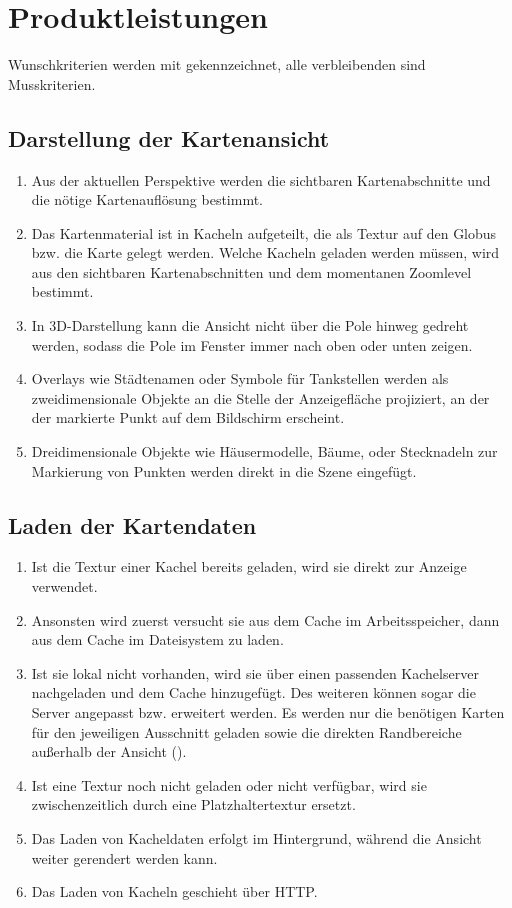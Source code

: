 \documentclass[10pt]{scrreprt}
\begin{document}
\chapter{Produktleistungen}

\renewcommand{\labelenumi}{\textbf{/L\numprint{\theenumi}0/}}
Wunschkriterien werden mit \W  gekennzeichnet, alle verbleibenden sind Musskriterien.

\section{Darstellung der Kartenansicht}
\begin{enumerate}[leftmargin=2cm]
\item Aus der aktuellen Perspektive werden die sichtbaren Kartenabschnitte und die nötige Kartenauflösung bestimmt.
\item Das Kartenmaterial ist in Kacheln aufgeteilt, die als Textur auf den Globus bzw. die Karte gelegt werden. Welche Kacheln geladen werden müssen, wird  aus den sichtbaren Kartenabschnitten und dem momentanen Zoomlevel bestimmt.
\item In 3D-Darstellung kann die Ansicht nicht über die Pole hinweg gedreht werden, sodass die Pole im Fenster immer nach oben oder unten zeigen.
\item Overlays wie Städtenamen oder Symbole für Tankstellen werden als zweidimensionale Objekte an die Stelle der Anzeigefläche projiziert, an der der markierte Punkt auf dem Bildschirm erscheint.
\item \W Dreidimensionale Objekte wie Häusermodelle, Bäume, oder Stecknadeln zur Markierung von Punkten werden direkt in die Szene eingefügt.
\end{enumerate}

\section{Laden der Kartendaten}
\begin{enumerate}[resume,leftmargin=2cm]
\item Ist die Textur einer Kachel bereits geladen, wird sie direkt zur Anzeige verwendet.
\item \W Ansonsten wird zuerst versucht sie aus dem Cache im Arbeitsspeicher, dann aus dem Cache im Dateisystem zu laden.
\item Ist sie lokal nicht vorhanden, wird sie über einen passenden Kachelserver nachgeladen und dem Cache hinzugefügt. Des weiteren können sogar die Server angepasst bzw. erweitert werden. Es werden nur die benötigen Karten für den jeweiligen Ausschnitt geladen sowie die direkten Randbereiche außerhalb der Ansicht (\W).
\item Ist eine Textur noch nicht geladen oder nicht verfügbar, wird sie zwischenzeitlich durch eine Platzhaltertextur ersetzt.
\item Das Laden von Kacheldaten erfolgt im Hintergrund, während die Ansicht weiter gerendert werden kann.
\item Das Laden von Kacheln geschieht über HTTP.
\end{enumerate}
\end{document}
